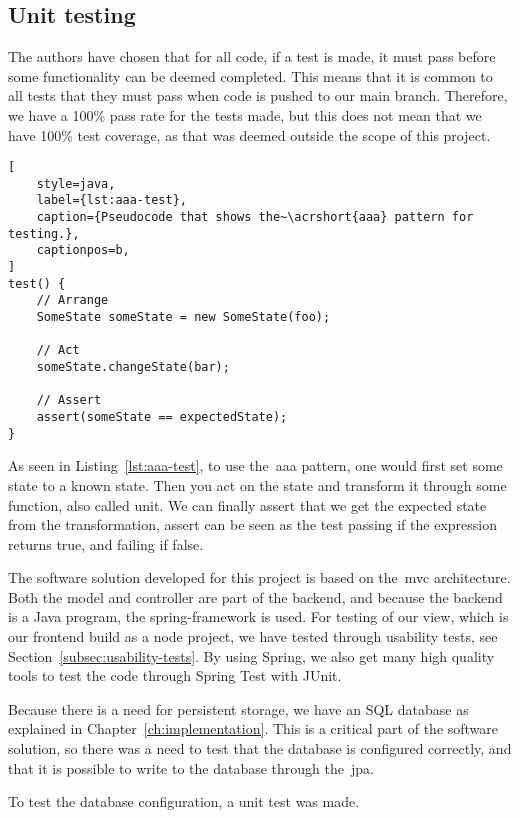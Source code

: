 \subsection{Unit testing}\label{subsec:unit-tests}

The authors have chosen that for all code, if a test is made, it must pass before some functionality can be
deemed completed.
This means that it is common to all tests that they must pass when code is pushed to our main branch.
Therefore, we have a 100\% pass rate for the tests made, but this does not mean that we
have 100\% test coverage, as that was deemed outside the scope of this project.

\begin{lstlisting}[
    style=java,
    label={lst:aaa-test},
    caption={Pseudocode that shows the~\acrshort{aaa} pattern for testing.},
    captionpos=b,
]
test() {
    // Arrange
    SomeState someState = new SomeState(foo);

    // Act
    someState.changeState(bar);

    // Assert
    assert(someState == expectedState);
}
\end{lstlisting}

As seen in Listing~\ref{lst:aaa-test}, to use the~\acrshort{aaa} pattern,
one would first set some state to a known state.
Then you act on the state and transform it through some function, also called unit.
We can finally assert that we get the expected state from the transformation, assert can be seen
as the test passing if the expression returns true, and failing if false.

The software solution developed for this project is based on the~\acrfull{mvc} architecture.
Both the model and controller are part of the backend, and because the backend is a Java program,
the spring-framework is used.
For testing of our view, which is our frontend build as a node project, we have tested through usability tests,
see Section~\ref{subsec:usability-tests}.
By using Spring, we also get many high quality tools to test the code through Spring Test with JUnit.

Because there is a need for persistent storage, we have an SQL database as explained in Chapter~\ref{ch:implementation}.
This is a critical part of the software solution, so there was a need to test that the database is configured
correctly, and that it is possible to write to the database through the~\acrfull{jpa}.

To test the database configuration, a unit test was made.

